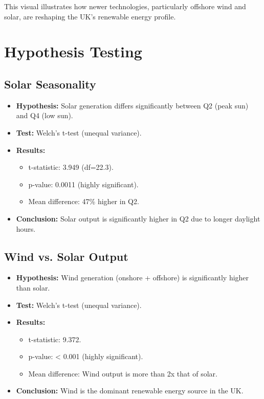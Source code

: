 \documentclass[11pt]{article}
\begin{document}
This visual illustrates how newer technologies, particularly offshore wind and solar, are reshaping the UK's renewable energy profile.

\section{Hypothesis Testing}
\subsection{Solar Seasonality}
\begin{itemize}
  \item \textbf{Hypothesis:} Solar generation differs significantly between Q2 (peak sun) and Q4 (low sun).
  \item \textbf{Test:} Welch's t-test (unequal variance).
  \item \textbf{Results:}
    \begin{itemize}
      \item t-statistic: 3.949 (df=22.3).
      \item p-value: 0.0011 (highly significant).
      \item Mean difference: 47\% higher in Q2.
    \end{itemize}
  \item \textbf{Conclusion:} Solar output is significantly higher in Q2 due to longer daylight hours.
\end{itemize}

\subsection{Wind vs. Solar Output}
\begin{itemize}
  \item \textbf{Hypothesis:} Wind generation (onshore + offshore) is significantly higher than solar.
  \item \textbf{Test:} Welch's t-test (unequal variance).
  \item \textbf{Results:}
    \begin{itemize}
      \item t-statistic: 9.372.
      \item p-value: < 0.001 (highly significant).
      \item Mean difference: Wind output is more than 2x that of solar.
    \end{itemize}
  \item \textbf{Conclusion:} Wind is the dominant renewable energy source in the UK.
\end{itemize}
\end{document}
